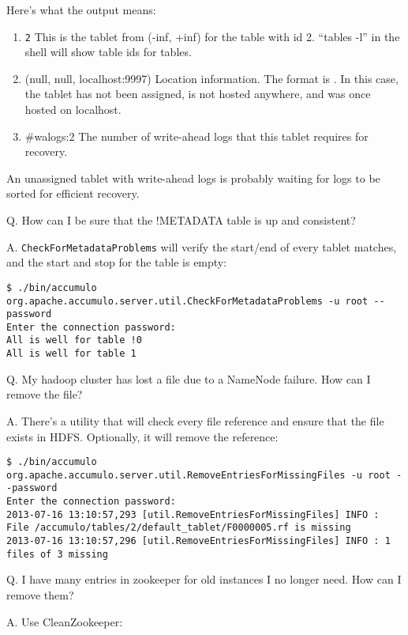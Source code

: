 Here's what the output means:

\begin{enumerate}
\item{\texttt{2\<\<} This is the tablet from (-inf, +inf) for the
  table with id 2.  ``tables -l'' in the shell will show table ids for
  tables.}
\item{\@(null, null, localhost:9997)} Location information.  The
  format is .  In this case, the
  tablet has not been assigned, is not hosted anywhere, and was once
  hosted on localhost.
\item{#walogs:2} The number of write-ahead logs that this tablet requires for recovery.
\end{enumerate}

An unassigned tablet with write-ahead logs is probably waiting for
logs to be sorted for efficient recovery.

Q. How can I be sure that the !METADATA table is up and consistent?

A. \texttt{CheckForMetadataProblems} will verify the start/end of
every tablet matches, and the start and stop for the table is empty:

\small
\begin{verbatim}
$ ./bin/accumulo org.apache.accumulo.server.util.CheckForMetadataProblems -u root --password
Enter the connection password: 
All is well for table !0
All is well for table 1
\end{verbatim}
\normalsize

Q. My hadoop cluster has lost a file due to a NameNode failure.  How can I remove the file?

A. There's a utility that will check every file reference and ensure
that the file exists in HDFS.  Optionally, it will remove the
reference:

\small
\begin{verbatim}
$ ./bin/accumulo org.apache.accumulo.server.util.RemoveEntriesForMissingFiles -u root --password
Enter the connection password: 
2013-07-16 13:10:57,293 [util.RemoveEntriesForMissingFiles] INFO : File /accumulo/tables/2/default_tablet/F0000005.rf is missing
2013-07-16 13:10:57,296 [util.RemoveEntriesForMissingFiles] INFO : 1 files of 3 missing
\end{verbatim}
\normalsize

Q. I have many entries in zookeeper for old instances I no longer need.  How can I remove them?

A. Use CleanZookeeper:

